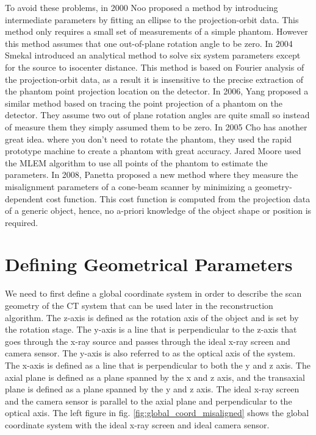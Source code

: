 To avoid these problems, in 2000 Noo \citep{Noo2000} proposed a method by introducing intermediate parameters by fitting an ellipse to the projection-orbit data.  This method only requires a small set of measurements of a simple phantom.  However this method assumes that one out-of-plane rotation angle to be zero.  In 2004 Smekal introduced an analytical method to solve six system parameters except for the source to isocenter distance.  This method is based on Fourier analysis of the projection-orbit data, as a result it is insensitive to the precise extraction of the phantom point projection location on the detector.  In 2006, Yang \citep{Yang2006} proposed a similar method based on tracing the point projection of a phantom on the detector.  They assume two out of plane rotation angles are quite small so instead of measure them they simply assumed them to be zero.  In 2005 Cho has another great idea. \citep{Cho2005} where you don't need to rotate the phantom, they used the rapid prototype machine to create a phantom with great accuracy.  Jared Moore used the MLEM algorithm to use all points of the phantom to estimate the parameters.  In 2008, Panetta \citep{Panetta2008} proposed a new method where they measure the misalignment parameters of a cone-beam scanner by minimizing a geometry-dependent cost function.  This cost function is computed from the projection data of a generic object, hence, no a-priori knowledge of the object shape or position is required.  

\section{Defining Geometrical Parameters}
We need to first define a global coordinate system in order to describe the scan geometry of the CT system that can be used later in the reconstruction algorithm.  The z-axis is defined as the rotation axis of the object and is set by the rotation stage.  The y-axis is a line that is perpendicular to the z-axis that goes through the x-ray source and passes through the ideal x-ray screen and camera sensor.  The y-axis is also referred to as the optical axis of the system.  The x-axis is defined as a line that is perpendicular to both the y and z axis.  The axial plane is defined as a plane spanned by the x and z axis, and the transaxial plane is defined as a plane spanned by the y and z axis.  The ideal x-ray screen and the camera sensor is parallel to the axial plane and perpendicular to the optical axis.  The left figure in fig. \ref{fig:global_coord_misaligned} shows the global coordinate system with the ideal x-ray screen and ideal camera sensor.  

